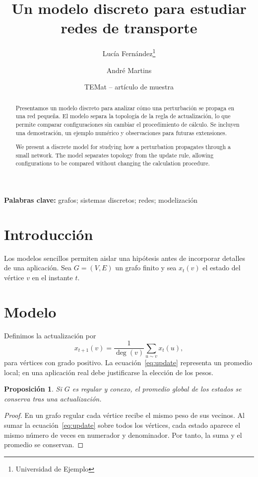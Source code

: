 \documentclass[11pt,a4paper]{article}
\title{Un modelo discreto para estudiar redes de transporte}
\author{Lucía Fernández\thanks{Universidad de Ejemplo}\and André Martins}
\date{TEMat -- artículo de muestra}
\newtheorem{proposition}{Proposición}
\begin{document}
\maketitle
\begin{abstract}
Presentamos un modelo discreto para analizar cómo una perturbación se propaga
en una red pequeña. El modelo separa la topología de la regla de actualización,
lo que permite comparar configuraciones sin cambiar el procedimiento de
cálculo. Se incluyen una demostración, un ejemplo numérico y observaciones
para futuras extensiones.
\end{abstract}
\noindent\textbf{Palabras clave:} grafos; sistemas discretos; redes; modelización

\begin{abstract}
We present a discrete model for studying how a perturbation propagates through
a small network. The model separates topology from the update rule, allowing
configurations to be compared without changing the calculation procedure.
\end{abstract}

\section{Introducción}
Los modelos sencillos permiten aislar una hipótesis antes de incorporar
detalles de una aplicación. Sea $G=(V,E)$ un grafo finito y sea $x_t(v)$ el
estado del vértice $v$ en el instante $t$.

\section{Modelo}
Definimos la actualización por
\begin{equation}
 x_{t+1}(v)=\frac{1}{\deg(v)}\sum_{u\sim v}x_t(u),
 \label{eq:update}
\end{equation}
para vértices con grado positivo. La ecuación~\ref{eq:update} representa un
promedio local; en una aplicación real debe justificarse la elección de los
pesos.

\begin{proposition}
Si $G$ es regular y conexo, el promedio global de los estados se conserva tras
una actualización.
\end{proposition}
\begin{proof}
En un grafo regular cada vértice recibe el mismo peso de sus vecinos. Al sumar
la ecuación~\ref{eq:update} sobre todos los vértices, cada estado aparece el
mismo número de veces en numerador y denominador. Por tanto, la suma y el
promedio se conservan.
\end{proof}
\end{document}
